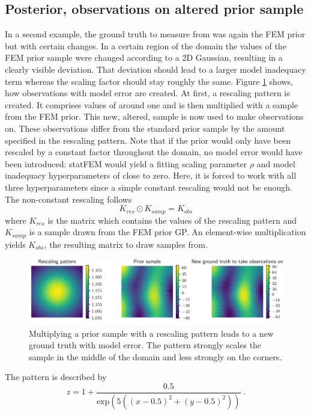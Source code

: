 \documentclass[%
  a4paper,oneside,%
  11pt,%
  smallchapters,
  style=printdev,
  extramargin,
  green,%
  rgb, <cmyk>
  ]{tubsbook}
\begin{document}
\subsection{Posterior, observations on altered prior sample}
In a second example, the ground truth to measure from was again the FEM prior but with certain changes. In a certain region of the domain the values of the FEM prior sample were changed according to a 2D Gaussian, resulting in a clearly visible deviation. That deviation should lead to a larger model inadequacy term whereas the scaling factor should stay roughly the same. Figure \ref{fig:ObsPat} shows, how observations with model error are created. At first, a rescaling pattern is created. It comprises values of around one and is then multiplied with a sample from the FEM prior. This new, altered, sample is now used to make observations on. These observations differ from the standard prior sample by the amount specified in the rescaling pattern. Note that if the prior would only have been rescaled by a constant factor throughout the domain, no model error would have been introduced: statFEM would yield a fitting scaling parameter $\rho$ and model inadequacy hyperparameters of close to zero. Here, it is forced to work with all three hyperparameters since a simple constant rescaling would not be enough. The non-constant rescaling follows
\begin{equation}
K_{res} \odot K_{samp} = K_{obs}
\end{equation}
where $K_{res}$ is the matrix which contains the values of the rescaling pattern and $K_{samp}$ is a sample drawn from the FEM prior GP. An element-wise multiplication yields $K_{obs}$, the resulting matrix to draw samples from.
\begin{figure}[!ht]
\includegraphics[width=1\textwidth]{pics/ObsPattern.pdf}
\centering
\caption{Multiplying a prior sample with a rescaling pattern leads to a new ground truth with model error. The pattern strongly scales the sample in the middle of the domain and less strongly on the corners.}
\label{fig:ObsPat}
\end{figure}

The pattern is described by
\begin{equation}
z = 1+\frac{0.5}{\mathrm{exp}(5((x-0.5)^2 + (y-0.5)^2))} \;.
\end{equation}
\end{document}
